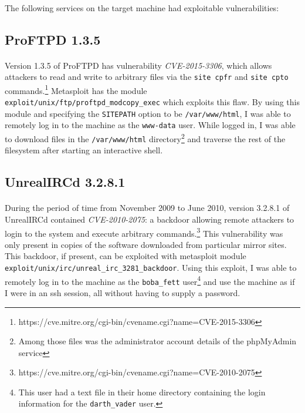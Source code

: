 \documentclass{article}
\begin{document}
\paragraph{}
The following services on the target machine had exploitable vulnerabilities:

\subsection{ProFTPD 1.3.5}
\paragraph{}
Version 1.3.5 of ProFTPD has vulnerability \emph{CVE-2015-3306}, which allows attackers to read and write to arbitrary files via the \texttt{site cpfr} and \texttt{site cpto} commands.\footnote{https://cve.mitre.org/cgi-bin/cvename.cgi?name=CVE-2015-3306}
Metasploit has the module \texttt{exploit/unix/ftp/proftpd\_modcopy\_exec} which exploits this flaw.
By using this module and specifying the \texttt{SITEPATH} option to be \texttt{/var/www/html}, I was able to remotely log in to the machine as the \texttt{www-data} user.
While logged in, I was able to download files in the \texttt{/var/www/html} directory\footnote{Among those files was the administrator account details of the phpMyAdmin service} and traverse the rest of the filesystem after starting an interactive shell.

\subsection{UnrealIRCd 3.2.8.1}
\paragraph{}
During the period of time from November 2009 to June 2010, version 3.2.8.1 of UnrealIRCd contained \emph{CVE-2010-2075}: a backdoor allowing remote attackers to login to the system and execute arbitrary commands.\footnote{https://cve.mitre.org/cgi-bin/cvename.cgi?name=CVE-2010-2075}
This vulnerability was only present in copies of the software downloaded from particular mirror sites.
This backdoor, if present, can be exploited with metasploit module \texttt{exploit/unix/irc/unreal\_irc\_3281\_backdoor}.
Using this exploit, I was able to remotely log in to the machine as the \texttt{boba\_fett} user\footnote{This user had a text file in their home directory containing the login information for the \texttt{darth\_vader} user.} and use the machine as if I were in an ssh session, all without having to supply a password.
\end{document}
